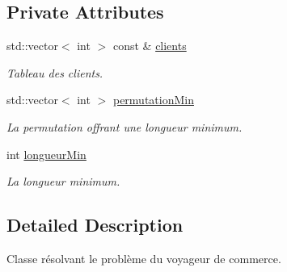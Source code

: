 \subsection*{\-Private \-Attributes}
\begin{DoxyCompactItemize}
\item 
\hypertarget{classVoyageurCommerce2opti_ada54e7751780f59762d97ab9d016a8fe}{std\-::vector$<$ int $>$ const \& \hyperlink{classVoyageurCommerce2opti_ada54e7751780f59762d97ab9d016a8fe}{clients}}\label{classVoyageurCommerce2opti_ada54e7751780f59762d97ab9d016a8fe}

\begin{DoxyCompactList}\small\item\em \-Tableau des clients. \end{DoxyCompactList}\item 
\hypertarget{classVoyageurCommerce2opti_a906db95ec646cca3637c1f86d34f7ec7}{std\-::vector$<$ int $>$ \hyperlink{classVoyageurCommerce2opti_a906db95ec646cca3637c1f86d34f7ec7}{permutation\-Min}}\label{classVoyageurCommerce2opti_a906db95ec646cca3637c1f86d34f7ec7}

\begin{DoxyCompactList}\small\item\em \-La permutation offrant une longueur minimum. \end{DoxyCompactList}\item 
\hypertarget{classVoyageurCommerce2opti_a3adfaf268f6b268121a955d3f3670df4}{int \hyperlink{classVoyageurCommerce2opti_a3adfaf268f6b268121a955d3f3670df4}{longueur\-Min}}\label{classVoyageurCommerce2opti_a3adfaf268f6b268121a955d3f3670df4}

\begin{DoxyCompactList}\small\item\em \-La longueur minimum. \end{DoxyCompactList}\end{DoxyCompactItemize}


\subsection{\-Detailed \-Description}
\-Classe résolvant le problème du voyageur de commerce. 

